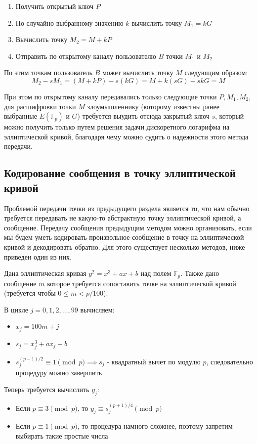 \begin{enumerate}
	\item Получить открытый ключ $P$
	\item По случайно выбранному значению $k$ вычислить точку $M_1=kG$
	\item Вычислить точку $M_2=M+kP$
	\item Отправить по открытому каналу пользователю $B$ точки $M_1$ и $M_2$
\end{enumerate}

По этим точкам пользователь $B$ может вычислить точку $M$ следующим образом:
%
\[
M_2-sM_1 = (M+kP) - s(kG) = M + k(sG) - skG = M
\]

При этом по открытому каналу передавались только следующие точки $P, M_1, M_2$, для расшифровки точки $M$ злоумышленнику (которому известны ранее выбранные $E(\mathbb F_p)$ и $G$) требуется выудить отсюда закрытый ключ $s$, который можно получить только путем решения задачи дискоретного логарифма на эллиптической кривой, благодаря чему можно судить о надежности этого метода передачи.

\subsection{Кодирование сообщения в точку эллиптической кривой}

Проблемой передачи точки из предыдущего раздела является то, что нам обычно требуется передавать не какую-то абстрактную точку эллиптической кривой, а сообщение. Передачу сообщения предыдущим методом можно организовать, если мы будем уметь кодировать произвольное сообщение в точку на эллиптической кривой и декодировать обратно. Для этого существует несколько методов, ниже приведен один из них.

\begin{tcolorbox}[title=Koblitz's Method]
	Дана эллиптическая кривая $y^2=x^3+ax+b$ над полем $\mathbb F_p$. Также дано сообщение $m$ которое требуется сопоставить точке на эллиптической кривой (требуется чтобы $0 \leq m < p/100$).
	
	В цикле $j=0,1,2,\dots,99$ вычисляем:
	\begin{itemize}
		\item $x_j=100m+j$
		\item $s_j = x_j^3+ax_j+b$
		\item $s_j^{(p-1)/2}\equiv 1 \pmod p \implies s_j$ - квадратный вычет по модулю $p$, следовательно процедуру можно завершить 
	\end{itemize}
	
	Теперь требуется вычислить $y_j$:
	
	\begin{itemize}
		\item Если $p \equiv 3 \pmod p$, то $y_j \equiv s_j^{(p+1)/4} \pmod p$
		\item Если $p \equiv 1 \pmod p$, то процедура намного сложнее, поэтому запретим выбирать такие простые числа
	\end{itemize}
\end{tcolorbox}

